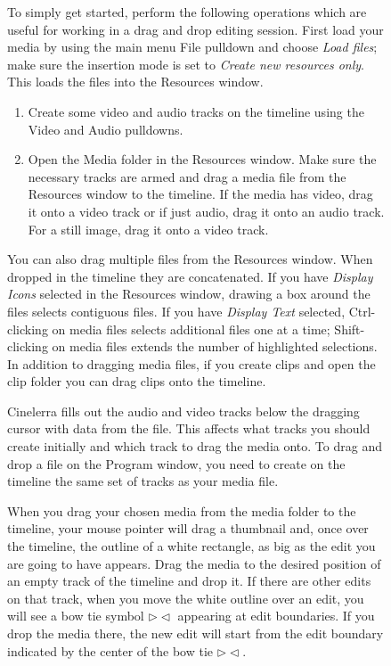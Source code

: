 \begin{figure}
To simply get started, perform the following operations which are useful for working in a drag and drop editing session.  First load your media by using the main menu File pulldown and choose \textit{Load files}; make sure the insertion mode is set to \textit{Create new resources only}.  This loads the files into the Resources window.

\begin{enumerate}
    \item Create some video and audio tracks on the timeline using the Video and Audio pulldowns.
    \item Open the Media folder in the Resources window.  Make sure the necessary tracks are armed and drag
    a media file from the Resources window to the timeline. If the media has video, drag it onto a video 
    track or if just audio, drag it onto an audio track. For a still image, drag it onto a video track.
\end{enumerate}

\noindent You can also drag multiple files from the Resources window. When dropped in the timeline they are concatenated. If you have \textit{Display Icons} selected in the Resources window, drawing a box around the files selects contiguous files. If you have \textit{Display Text} selected, Ctrl-clicking on media files selects additional files one at a time; Shift-clicking on media files extends the number of highlighted selections.  In addition to dragging media files, if you create clips and open the clip folder you can drag
clips onto the timeline.

Cinelerra fills out the audio and video tracks below the dragging cursor with data from the file. This affects what tracks you should create initially and which track to drag the media onto. To drag and drop a file on the Program window, you need to create on the timeline the same set of tracks as your media file.

When you drag your chosen media from the media folder to the timeline, your mouse pointer will drag a thumbnail and, once over the timeline, the outline of a white rectangle, as big as the edit you are going to have appears.  Drag the media to the desired position of an empty track of the timeline and drop it.  If there are other edits on that track, when you move the white outline over an edit, you will see a bow tie symbol $\rhd\lhd$ appearing at edit boundaries. If you drop the media there, the new edit will start from the edit boundary indicated by the center of the bow tie $\rhd\lhd$.


\end{figure}
